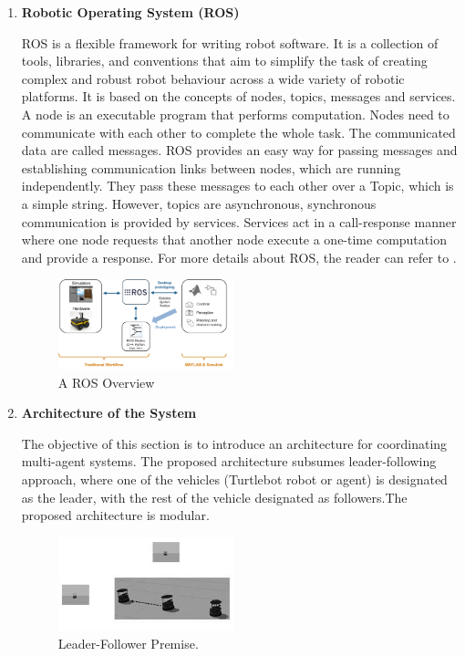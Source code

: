 \documentclass[journal]{IEEEtran}
\begin{document}
\begin{enumerate}
\item \textbf{Robotic Operating System (ROS)}

ROS is a flexible framework for writing robot software. It is a collection of tools, libraries, and conventions that aim to simplify the task of creating complex and robust robot behaviour across a wide variety of robotic platforms. It is based on the concepts of nodes, topics, messages and services. A node is an executable program that performs computation. Nodes need to communicate with each other to complete the whole task. The communicated data are called messages. ROS provides an easy way for passing messages and establishing communication links between nodes, which are running independently. They pass these messages to each other over a Topic, which is a simple string. However, topics are asynchronous, synchronous communication is provided by services. Services act in a call-response manner where one node requests that another node execute a one-time computation and provide a response. For more details about ROS, the reader can refer to \cite{temp2}.

\begin{figure}[!h]
\begin{center}
\includegraphics[width=2in]{6.png}
\caption{A ROS Overview \cite{temp2}}
\end{center}
\end{figure}




\item \textbf{Architecture of the System}



The objective of this section is to introduce an architecture for coordinating multi-agent systems. The proposed architecture subsumes leader-following approach, where one of the vehicles (Turtlebot robot or agent) is designated as the leader, with the rest of the vehicle designated as followers.The proposed architecture is modular.


\begin{figure}[!h]
\begin{center}
\includegraphics[width=2in]{1.jpeg}
\caption{Leader-Follower Premise.}
\end{center}
\label{fig:mypicture2}
\end{figure}




\end{enumerate}
\end{document}
